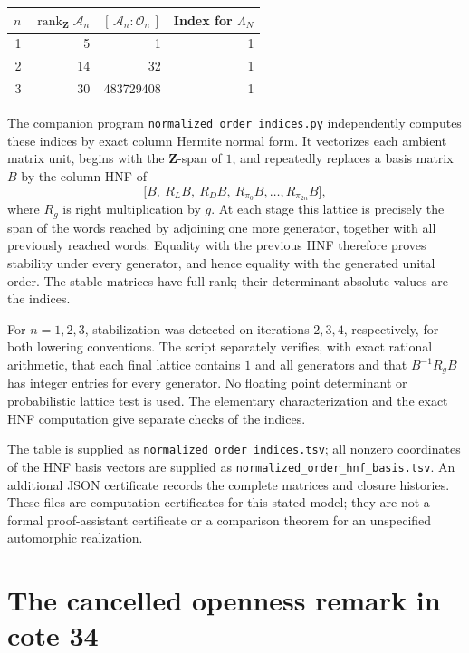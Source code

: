 \documentclass[11pt,a4paper]{article}
\theoremstyle{remark}
\begin{document}
\begin{center}
\begin{tabular}{rrrr}
\toprule
\(n\)&\(\operatorname{rank}_{\mathbf Z}\mathcal A_n\)&
\([\,\mathcal A_n:\mathcal O_n\,]\)&
Index for \(\Lambda_N\)\\
\midrule
1&5&1&1\\
2&14&32&1\\
3&30&483729408&1\\
\bottomrule
\end{tabular}
\end{center}

The companion program
\texttt{normalized\_order\_indices.py} independently computes
these indices by exact column Hermite normal form.  It
vectorizes each ambient matrix unit, begins with the
\(\mathbf Z\)-span of \(1\), and repeatedly replaces a
basis matrix \(B\) by the column HNF of
\[
\bigl[B,\ R_LB,\ R_DB,\ R_{\pi_0}B,\ldots,
                         R_{\pi_{2n}}B\bigr],
\]
where \(R_g\) is right multiplication by \(g\).
At each stage this lattice is precisely the span of the
words reached by adjoining one more generator, together
with all previously reached words.  Equality with the
previous HNF therefore proves stability under every
generator, and hence equality with the generated
unital order.  The stable matrices have full rank;
their determinant absolute values are the indices.

For \(n=1,2,3\), stabilization was detected on iterations
\(2,3,4\), respectively, for both lowering conventions.
The script separately verifies, with exact rational
arithmetic, that each final lattice contains \(1\) and
all generators and that \(B^{-1}R_gB\) has integer
entries for every generator.  No floating point
determinant or probabilistic lattice test is used.
The elementary characterization and the exact HNF
computation give separate checks of the indices.

The table is supplied as
\texttt{normalized\_order\_indices.tsv}; all nonzero
coordinates of the HNF basis vectors are supplied as
\texttt{normalized\_order\_hnf\_basis.tsv}.  An additional
JSON certificate records the complete matrices and
closure histories.  These files are computation
certificates for this stated model; they are not a
formal proof-assistant certificate or a comparison
theorem for an unspecified automorphic realization.



\section{The cancelled openness remark in cote 34}
\label{sec:q03}
\end{document}
